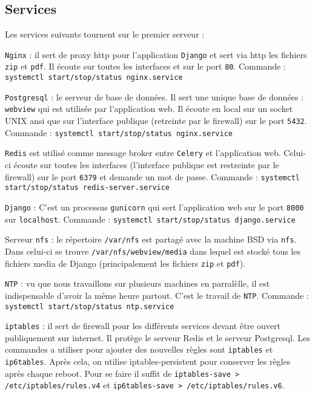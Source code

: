 \documentclass[10pt,a4paper]{article}
\begin{document}
\subsection{Services}
Les services suivants tournent sur le premier serveur :

\texttt{Nginx} : il sert de proxy http pour l'application \texttt{Django} et sert via http les fichiers \texttt{zip} et \texttt{pdf}.
Il écoute sur toutes les interfaces et sur le port \texttt{80}.
Commande : \texttt{systemctl start/stop/status nginx.service}

\texttt{Postgresql} : le serveur de base de données.
Il sert une unique base de données : \texttt{webview} qui est utilisée par l'application web.
Il écoute en local sur un socket UNIX ansi que sur l'interface publique (retreinte par le firewall) sur le port \texttt{5432}.
Commande : \texttt{systemctl start/stop/status nginx.service}

\texttt{Redis} est utilisé comme message broker entre \texttt{Celery} et l'application web.
Celui-ci écoute sur toutes les interfaces (l'interface publique est restreinte par le firewall) sur le port \texttt{6379} et demande un mot de passe.
Commande : \texttt{systemctl start/stop/status redis-server.service}

\texttt{Django} : C'est un processus \texttt{gunicorn} qui sert l'application web sur le port \texttt{8000} sur \texttt{localhost}.
Commande : \texttt{systemctl start/stop/status django.service}

Serveur \texttt{nfs} : le répertoire \texttt{/var/nfs} est partagé avec la machine BSD via \texttt{nfs}.
Dans celui-ci se trouve \texttt{/var/nfs/webview/media} dans lequel est stocké tous les fichiers media de Django (principalement les fichiers \texttt{zip} et \texttt{pdf}).

\texttt{NTP} : vu que nous travaillons sur plusieurs machines en parralèlle, il est indispensable d'avoir la même heure partout.
C'est le travail de \texttt{NTP}.
Commande : \texttt{systemctl start/stop/status ntp.service}

\texttt{iptables} : il sert de firewall pour les différents services devant être ouvert publiquement sur internet.
Il protège le serveur Redis et le serveur Postgresql.
Les commandes a utiliser pour ajouter des nouvelles règles sont \texttt{iptables} et \texttt{ip6tables}.
Après cela, on utilise iptables-persistent pour conserver les règles après chaque reboot. Pour se faire il suffit de \texttt{iptables-save > /etc/iptables/rules.v4} et \texttt{ip6tables-save > /etc/iptables/rules.v6}.
\end{document}
